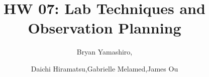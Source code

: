 \documentclass[onecolumn]{aastex6}
\begin{document}

\title{HW 07: Lab Techniques and Observation Planning}


\author{Bryan Yamashiro,}
\author{Daichi Hiramatsu,Gabrielle Melamed,James Ou}








\end{document}
